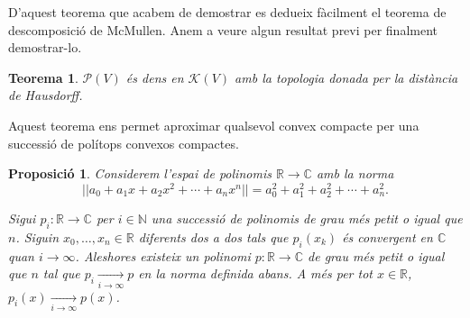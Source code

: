 \documentclass{article}
\newtheorem{teorema}{Teorema}
\newtheorem{proposicio}{Proposici\'{o}}
\theoremstyle{definition}
\begin{document}
D'aquest teorema que acabem de demostrar es dedueix f\`{a}cilment el teorema de descomposici\'{o} de McMullen. Anem a veure algun resultat previ per finalment demostrar-lo.

\begin{teorema}\label{Teo:politopsdensos}
$\mathcal{P}(V)$ \'{e}s dens en $\mathcal{K}(V)$ amb la topologia donada per la dist\`{a}ncia de Hausdorff.
\end{teorema}

Aquest teorema ens permet aproximar qualsevol convex compacte per una successi\'{o} de pol\'{i}tops convexos compactes.

\begin{proposicio}\label{Pro:convergenciapolinomis}
Considerem l'espai de polinomis $\mathbb{R}\rightarrow\mathbb{C}$ amb la norma
\[||a_0+a_1x+a_2x^2+\cdots+a_nx^n||=a_0^2+a_1^2+a_2^2+\cdots+a_n^2.\]

Sigui $p_i:\mathbb{R}\rightarrow\mathbb{C}$ per $i\in\mathbb{N}$ una successi\'{o} de polinomis de grau m\'{e}s petit o igual que $n$. Siguin $x_0,\ldots,x_n\in\mathbb{R}$ diferents dos a dos tals que $p_i(x_k)$ \'{e}s convergent en $\mathbb{C}$ quan $i\to\infty$. Aleshores existeix un polinomi $p:\mathbb{R}\rightarrow\mathbb{C}$ de grau m\'{e}s petit o igual que $n$ tal que $p_i\xrightarrow[i\to\infty]{}p$ en la norma definida abans. A m\'{e}s per tot $x\in\mathbb{R}$, $p_i(x)\xrightarrow[i\to\infty]{}p(x)$.
\end{proposicio}
\end{document}
